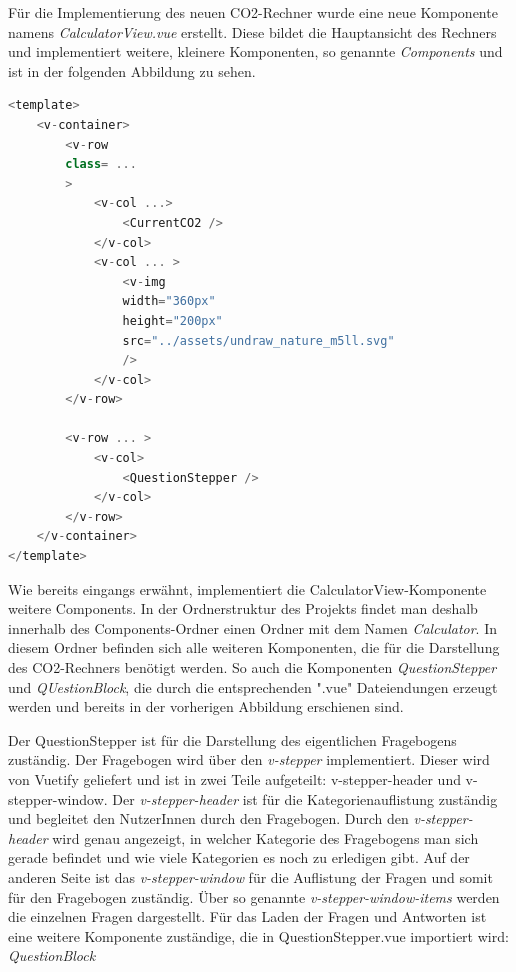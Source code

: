 Für die Implementierung des neuen CO2-Rechner wurde eine neue Komponente namens \textit{CalculatorView.vue} erstellt.
Diese bildet die Hauptansicht des Rechners und implementiert weitere, kleinere Komponenten, so genannte \textit{Components} und ist in der folgenden Abbildung zu sehen.

\begin{lstlisting}[language={JavaScript}, caption={Aufbau der CalculatorView.vue Komponente}]
<template>
    <v-container>
        <v-row
        class= ...
        >
            <v-col ...>
                <CurrentCO2 />
            </v-col>
            <v-col ... >
                <v-img
                width="360px"
                height="200px"
                src="../assets/undraw_nature_m5ll.svg"
                />
            </v-col>
        </v-row>

        <v-row ... >
            <v-col>
                <QuestionStepper />
            </v-col>
        </v-row>
    </v-container>
</template>
\end{lstlisting}

Wie bereits eingangs erwähnt, implementiert die CalculatorView-Komponente weitere Components.
In der Ordnerstruktur des Projekts findet man deshalb innerhalb des Components-Ordner einen Ordner mit dem Namen \textit{Calculator}.
In diesem Ordner befinden sich alle weiteren Komponenten, die für die Darstellung des CO2-Rechners benötigt werden.
So auch die Komponenten \textit{QuestionStepper} und \textit{QUestionBlock}, die durch die entsprechenden ".vue" Dateiendungen erzeugt werden und bereits in der vorherigen Abbildung erschienen sind.

Der QuestionStepper ist für die Darstellung des eigentlichen Fragebogens zuständig.
Der Fragebogen wird über den \textit{v-stepper} implementiert.
Dieser wird von Vuetify geliefert und ist in zwei Teile aufgeteilt: v-stepper-header und v-stepper-window.
Der \textit{v-stepper-header} ist für die Kategorienauflistung zuständig und begleitet den NutzerInnen durch den Fragebogen.
Durch den \textit{v-stepper-header} wird genau angezeigt, in welcher Kategorie des Fragebogens man sich gerade befindet und wie viele Kategorien es noch zu erledigen gibt.
Auf der anderen Seite ist das \textit{v-stepper-window} für die Auflistung der Fragen und somit für den Fragebogen zuständig.
Über so genannte \textit{v-stepper-window-items} werden die einzelnen Fragen dargestellt.
Für das Laden der Fragen und Antworten ist eine weitere Komponente zuständige, die in QuestionStepper.vue importiert wird: \textit{QuestionBlock}

